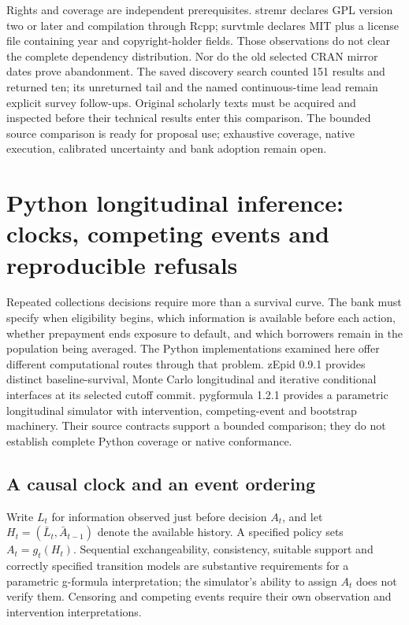 Rights and coverage are independent prerequisites. stremr declares GPL version
two or later and compilation through Rcpp; survtmle declares MIT plus a license
file containing year and copyright-holder fields. Those observations do not
clear the complete dependency distribution. Nor do the old selected CRAN
mirror dates prove abandonment. The saved discovery search counted 151 results
and returned ten; its unreturned tail and the named continuous-time lead
remain explicit survey follow-ups. Original scholarly texts must be acquired
and inspected before their technical results enter this comparison.
The bounded source comparison is ready for proposal use; exhaustive coverage,
native execution, calibrated uncertainty and bank adoption remain open.
\citep{exec23_longr_stremr,exec23_longr_survtmle}


\section{Python longitudinal inference: clocks, competing events and reproducible refusals}
\label{sec:exec24-longitudinal-python}
Repeated collections decisions require more than a survival curve. The bank
must specify when eligibility begins, which information is available before
each action, whether prepayment ends exposure to default, and which borrowers
remain in the population being averaged. The Python implementations examined
here offer different computational routes through that problem. zEpid 0.9.1
provides distinct baseline-survival, Monte Carlo longitudinal and iterative
conditional interfaces at its selected cutoff commit. pygformula 1.2.1
provides a parametric longitudinal simulator with intervention, competing-event
and bootstrap machinery. Their source contracts support a bounded comparison;
they do not establish complete Python coverage or native conformance.
\citep{exec24_longpy_zepid_source,exec24_longpy_pygformula_source}

\subsection{A causal clock and an event ordering}
Write $L_t$ for information observed just before decision $A_t$, and let
$H_t=(\bar L_t,\bar A_{t-1})$ denote the available history. A specified policy
sets $A_t=g_t(H_t)$. Sequential exchangeability, consistency, suitable support
and correctly specified transition models are substantive requirements for a
parametric g-formula interpretation; the simulator's ability to assign $A_t$
does not verify them. Censoring and competing events require their own
observation and intervention interpretations.


